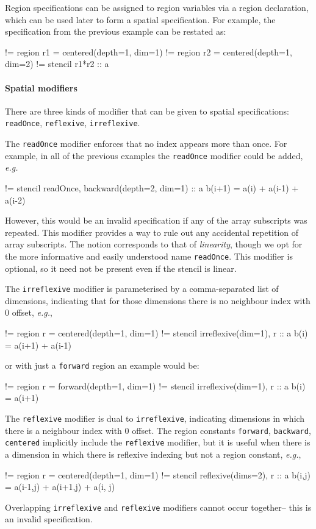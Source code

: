 \documentclass[9pt]{sigplanconf}
\theoremstyle{definition}
\newcommand{\eg}{\emph{e.g.}}
\newcommand{\term}[1]{\texttt{#1}}
\begin{document}
Region specifications can be assigned to region variables via
a region declaration, which can be used later to form a spatial
specification. For example, the specification from the previous
 example can be restated as:
\begin{ExmVerbatim}
!= region r1 = centered(depth=1, dim=1)
!= region r2 = centered(depth=1, dim=2)
!= stencil r1*r2 :: a
\end{ExmVerbatim}
\paragraph{Spatial modifiers}
There are three kinds of modifier that can be given to spatial
specifications: \texttt{readOnce}, \texttt{reflexive},
\texttt{irreflexive}.

The \texttt{readOnce} modifier enforces that no index appears
more than once. For example, in all of the previous examples the
\texttt{readOnce} modifier could be added, \eg{}
%
\begin{ExmVerbatim}
!= stencil readOnce, backward(depth=2, dim=1) :: a
b(i+1) = a(i) + a(i-1) + a(i-2)
\end{ExmVerbatim}
%
However, this would be an invalid specification if any of the
array subscripts was repeated. This modifier provides a way to
 rule out any accidental repetition of array subscripts.
The notion corresponds to that of \emph{linearity}, though we
opt for the more informative and easily understood name
\texttt{readOnce}. This modifier is optional, so it need not
be present even if the stencil is linear.

The \texttt{irreflexive} modifier is parameterised by a
comma-separated list of dimensions, indicating that for those
dimensions there is no neighbour index with $0$ offset, \eg{},
%
\begin{ExmVerbatim}
!= region r = centered(depth=1, dim=1)
!= stencil irreflexive(dim=1), r :: a
b(i) = a(i+1) + a(i-1)
\end{ExmVerbatim}
%
or with just a \texttt{forward} region an example would be:
%
\begin{ExmVerbatim}
!= region r = forward(depth=1, dim=1)
!= stencil irreflexive(dim=1), r :: a
b(i) = a(i+1)
\end{ExmVerbatim}

The \term{reflexive} modifier is dual to \term{irreflexive},
indicating dimensions in which there is a neighbour index with $0$
offset. The region constants \term{forward}, \term{backward},
\term{centered} implicitly include the \term{reflexive} modifier,
but it is useful when there is a dimension in which there is reflexive
indexing but not a region constant, \eg{},
\begin{ExmVerbatim}
!= region r = centered(depth=1, dim=1)
!= stencil reflexive(dims=2), r :: a
b(i,j) = a(i-1,j) + a(i+1,j) + a(i, j)
\end{ExmVerbatim}
Overlapping \term{irreflexive} and \term{reflexive} modifiers
cannot occur together-- this is an invalid specification.
\end{document}
